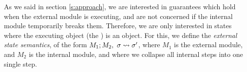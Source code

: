 As we said in section \ref{s:approach}, we are interested in guarantees which hold
when the external module is executing, and are not concerned if the internal module  temporarily
breaks them. Therefore, we are only interested in states where the
executing object (the ) is an  object. 
For this, we define the  \emph{external state semantics}, of the form 
$M_1 ; M_2,\ \sigma \leadsto \sigma'$, where $M_1$ is the external
module, and $M_2$ is the internal module, and where we
collapse all internal steps into one single step.

 


